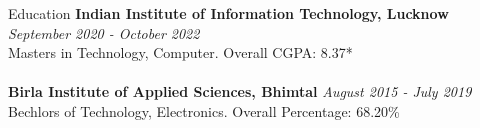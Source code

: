 \begin{rSection}{Education}
    {\bf Indian Institute of Information Technology, Lucknow} \hfill {\em September 2020 - October 2022}
    \\ Masters in Technology, Computer.\hfill { Overall CGPA: 8.37* }
    \\ \\
    {\bf Birla Institute of Applied Sciences, Bhimtal} \hfill {\em August 2015 - July 2019}
    \\ Bechlors of Technology, Electronics. \hfill { Overall Percentage: 68.20\%}
\end{rSection}